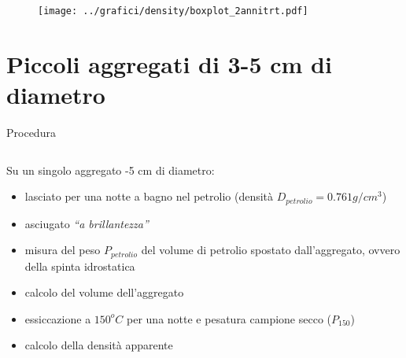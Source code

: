 \begin{frame}
  \begin{figure}[ht]
    \texttt{[image: ../grafici/density/boxplot\_2annitrt.pdf]}
  \end{figure}
\end{frame}





\section{Piccoli aggregati di 3-5 cm di diametro}

\begin{frame}{Procedura}
  \begin{columns}
    \begin{block}{Su un singolo aggregato -5 cm di diametro:}  
      \pause
      \begin{itemize}[<+->]
      \item lasciato per una notte a bagno nel petrolio
        \footnotesize{(densit\`a $D_{petrolio}=0.761g/cm^3$)}
      \item asciugato \textit{“a brillantezza”}
      \item misura del peso $P_{petrolio}$ del volume di petrolio
        spostato dall'aggregato, ovvero della spinta idrostatica
      \item  calcolo del volume dell'aggregato
      \item essiccazione a $150^oC$ per una notte e pesatura campione
        secco ($P_{150}$)
      \item calcolo della densit\`a apparente
      \end{itemize}
    \end{block}


\end{columns}
\end{frame}
